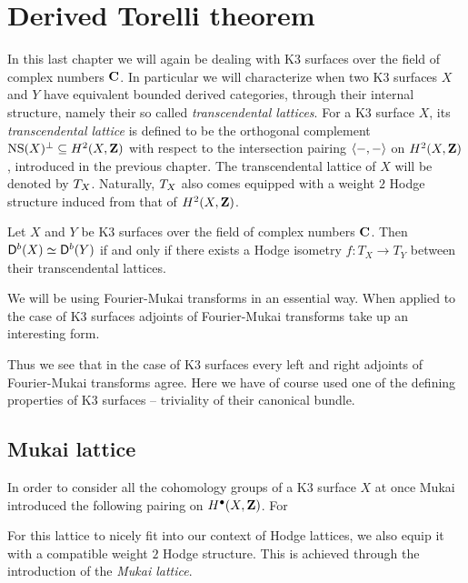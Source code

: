 \section{Derived Torelli theorem}
\label{Chapter: Derived Torelli theorem}

In this last chapter we will again be dealing with K3 surfaces over the field of complex numbers $\mathbf C$. In particular we will characterize when two K3 surfaces $X$ and $Y$ have equivalent bounded derived categories, through their internal structure, namely their so called \emph{transcendental lattices}. For a K3 surface $X$, its \emph{transcendental lattice} is defined to be the orthogonal complement $\operatorname{NS}(X)^\perp \subseteq H^{2}(X, \mathbf Z)$ with respect to the intersection pairing $\langle -, - \rangle$ on $H^{2}(X, \mathbf Z)$, introduced in the previous chapter. The transcendental lattice of $X$ will be denoted by $T_{X}$.
Naturally, $T_{X}$ also comes equipped with a weight $2$ Hodge structure induced from that of $H^{2}(X, \mathbf Z)$. 


\begin{theorem}
    Let $X$ and $Y$ be K3 surfaces over the field of complex numbers $\mathbf C$. Then $\mathsf{D}^b(X) \simeq \mathsf{D}^b(Y)$ if and only if there exists a Hodge isometry $f\colon T_X \to T_Y$ between their transcendental lattices.
\end{theorem}

We will be using Fourier-Mukai transforms in an essential way. When applied to the case of K3 surfaces adjoints of Fourier-Mukai transforms take up an interesting form.

Thus we see that in the case of K3 surfaces every left and right adjoints of Fourier-Mukai transforms agree.
Here we have of course used one of the defining properties of K3 surfaces -- triviality of their canonical bundle.

\subsection{Mukai lattice}

In order to consider all the cohomology groups of a K3 surface $X$ at once Mukai introduced the following pairing on $H^{\bullet}(X, \mathbf Z)$. For 

For this lattice to nicely fit into our context of Hodge lattices, we also equip it with a compatible weight $2$ Hodge structure. This is achieved through the introduction of the \emph{Mukai lattice}. 

